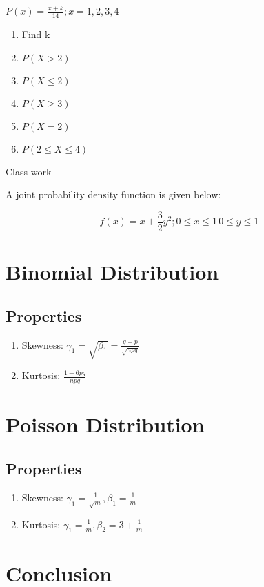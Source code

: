 \documentclass[14pt, a4paper,oneside, margin=1.4in]{book}
\begin{document}
$P(x) = \frac{x+k}{14}; x= 1,2,3,4$

\begin{enumerate}
  \item Find k
  \item $P(X>2)$
  \item $P(X \le 2)$
  \item $P(X \ge 3)$
  \item $P(X=2)$
  \item $P(2 \le X \le 4)$
\end{enumerate}

\TheSolution Class work

\Problem A joint probability density function is given below:

\[f(x) = x+ \frac32 y^2; 0\le x \le 1\, 0\le y \le 1\]

\chapter{Binomial Distribution}

\section{Properties}

\begin{enumerate}

\item Skewness: $\displaystyle \gamma_1 = \sqrt{\beta_1} = \frac{q-p}{\sqrt{npq}}$

\item Kurtosis: $\displaystyle \frac{1-6pq}{npq}$

\end{enumerate}

\chapter{Poisson Distribution}

\section{Properties}

\begin{enumerate}

\item Skewness: $\displaystyle \gamma_1 = \frac{1}{\sqrt{m}}, \beta_1 = \frac 1m$

\item Kurtosis: $\displaystyle \gamma_1 = \frac{1}{m}, \beta_2 = 3 + \frac 1m$

\end{enumerate}

\backmatter
\chapter{Conclusion}
\lipsum[8]

\tableofcontents
\end{document}

